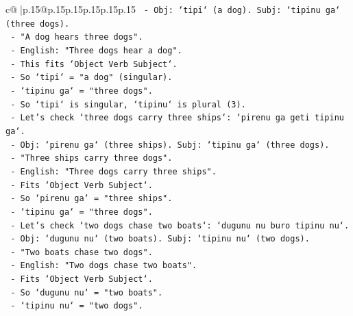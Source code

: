 \documentclass{article}
\begin{document}
{\begin{supertabular}{c@{$\;$}|p{.15\linewidth}@{}p{.15\linewidth}p{.15\linewidth}p{.15\linewidth}p{.15\linewidth}p{.15\linewidth}}
{{{\texttt{                             {-} Obj: `tipi` (a dog). Subj: `tipinu ga` (three dogs).} \\
\texttt{                             {-} "A dog hears three dogs".} \\
\texttt{                             {-} English: "Three dogs hear a dog".} \\
\texttt{                             {-} This fits `Object Verb Subject`.} \\
\texttt{                             {-} So `tipi` = "a dog" (singular).} \\
\texttt{                             {-} `tipinu ga` = "three dogs".} \\
\texttt{                             {-} So `tipi` is singular, `tipinu` is plural (3).} \\
\texttt{                           {-} Let's check `three dogs carry three ships`: `pirenu ga geti tipinu ga`.} \\
\texttt{                             {-} Obj: `pirenu ga` (three ships). Subj: `tipinu ga` (three dogs).} \\
\texttt{                             {-} "Three ships carry three dogs".} \\
\texttt{                             {-} English: "Three dogs carry three ships".} \\
\texttt{                             {-} Fits `Object Verb Subject`.} \\
\texttt{                             {-} So `pirenu ga` = "three ships".} \\
\texttt{                             {-} `tipinu ga` = "three dogs".} \\
\texttt{                           {-} Let's check `two dogs chase two boats`: `dugunu nu buro tipinu nu`.} \\
\texttt{                             {-} Obj: `dugunu nu` (two boats). Subj: `tipinu nu` (two dogs).} \\
\texttt{                             {-} "Two boats chase two dogs".} \\
\texttt{                             {-} English: "Two dogs chase two boats".} \\
\texttt{                             {-} Fits `Object Verb Subject`.} \\
\texttt{                             {-} So `dugunu nu` = "two boats".} \\
\texttt{                             {-} `tipinu nu` = "two dogs".} \\
}}}
\end{supertabular}}
\end{document}
